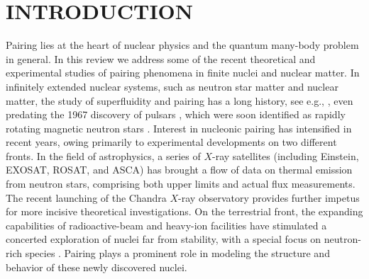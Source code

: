\documentclass[rmp,aps,floatfix]{revtex4}
\begin{document}
\tableofcontents


%
\section{INTRODUCTION}
\label{sec:introduction}

Pairing lies at the heart of nuclear physics and the quantum
many-body problem in general. In this review we address some
of the recent theoretical and experimental studies of pairing 
phenomena in finite nuclei and nuclear matter. 
In infinitely extended nuclear systems, such as neutron star matter 
and nuclear matter, 
the study of superfluidity and pairing has a 
long history, see e.g., \cite{migdal60,cms59,emerysessler}, 
even predating the 1967 discovery of pulsars \cite{hewish}, 
which were soon identified as rapidly rotating magnetic neutron 
stars \cite{gold}.  Interest in nucleonic pairing has intensified 
in recent years, owing primarily to experimental developments on two 
different fronts.  In the field of astrophysics, a series of $X$-ray 
satellites (including Einstein, EXOSAT, ROSAT, and ASCA) has brought a 
flow of data on thermal emission from neutron stars, comprising both upper 
limits and actual flux measurements.  The recent launching of the 
Chandra $X$-ray observatory provides further impetus for more incisive 
theoretical investigations.  On the terrestrial 
front, the expanding capabilities of radioactive-beam and heavy-ion 
facilities have stimulated a concerted exploration of 
nuclei far from stability, with a special focus on neutron-rich species 
\cite{riisager,mueller}.  Pairing plays a prominent role in modeling 
the structure and behavior of these newly discovered nuclei.  
\end{document}
